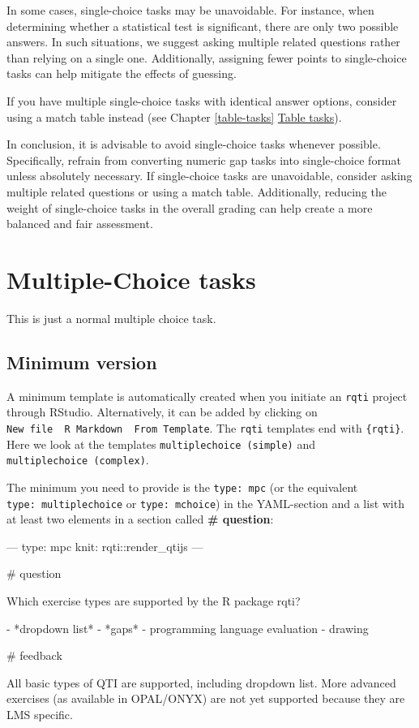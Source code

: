 \documentclass[twoside]{tufte-book}
\newenvironment{Shaded}{}{}
\begin{document}
In some cases, single-choice tasks may be unavoidable. For instance, when determining whether a statistical test is significant, there are only two possible answers. In such situations, we suggest asking multiple related questions rather than relying on a single one. Additionally, assigning fewer points to single-choice tasks can help mitigate the effects of guessing.

If you have multiple single-choice tasks with identical answer options, consider using a match table instead (see Chapter \ref{table-tasks} \href{table.html}{Table tasks}).

In conclusion, it is advisable to avoid single-choice tasks whenever possible. Specifically, refrain from converting numeric gap tasks into single-choice format unless absolutely necessary. If single-choice tasks are unavoidable, consider asking multiple related questions or using a match table. Additionally, reducing the weight of single-choice tasks in the overall grading can help create a more balanced and fair assessment.

\chapter{Multiple-Choice tasks}\label{multiple-choice-tasks}

This is just a normal multiple choice task.

\section{Minimum version}\label{minimum-version-1}

A minimum template is automatically created when you initiate an \texttt{rqti} project through RStudio. Alternatively, it can be added by clicking on \texttt{New\ file\ \textrightarrow{}\ R\ Markdown\ \textrightarrow{}\ From\ Template}. The \texttt{rqti} templates end with \texttt{\{rqti\}}. Here we look at the templates \texttt{multiplechoice\ (simple)} and \texttt{multiplechoice\ (complex)}.

The minimum you need to provide is the \texttt{type:\ mpc} (or the equivalent \texttt{type:\ multiplechoice} or \texttt{type:\ mchoice}) in the YAML-section and a list with at least two elements in a section called \textbf{\# question}:

\begin{Shaded}
\begin{Highlighting}
---
type: mpc
knit: rqti::render_qtijs
---

# question

Which exercise types are supported by the R package rqti?

- *dropdown list*
- *gaps*
- programming language evaluation
- drawing

# feedback

All basic types of QTI are supported, including dropdown list. More advanced
exercises (as available in OPAL/ONYX) are not yet supported because they are LMS
specific.
\end{Highlighting}
\end{Shaded}
\end{document}
